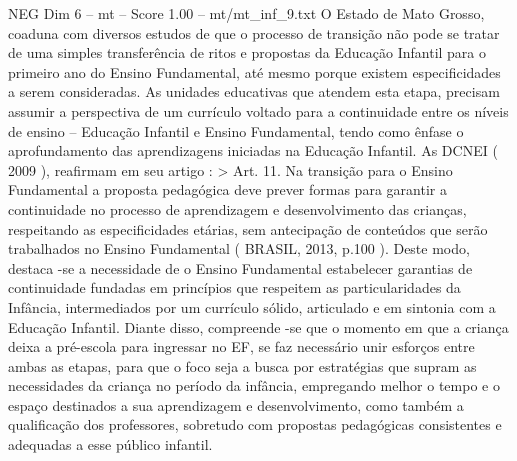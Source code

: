 \begin{textsample}{NEG Dim 6 – mt – Score 1.00 – mt/mt\_inf\_9.txt}
O Estado de Mato Grosso, coaduna com diversos estudos de que o processo de transição não pode se tratar de uma simples transferência de ritos e propostas da Educação Infantil para o primeiro ano do Ensino Fundamental, até mesmo porque existem especificidades a serem consideradas.
As unidades educativas que atendem esta etapa, precisam assumir a perspectiva de um currículo voltado para a continuidade entre os níveis de ensino – Educação Infantil e Ensino Fundamental, tendo como ênfase o aprofundamento das aprendizagens iniciadas na Educação Infantil.
As DCNEI ( 2009 ), reafirmam em seu artigo : > Art. 11.
Na transição para o Ensino Fundamental a proposta pedagógica deve prever formas para garantir a continuidade no processo de aprendizagem e desenvolvimento das crianças, respeitando as especificidades etárias, sem antecipação de conteúdos que serão trabalhados no Ensino Fundamental ( BRASIL, 2013, p.100 ).
Deste modo, destaca -se a necessidade de o Ensino Fundamental estabelecer garantias de continuidade fundadas em princípios que respeitem as particularidades da Infância, intermediados por um currículo sólido, articulado e em sintonia com a Educação Infantil.
Diante disso, compreende -se que o momento em que a criança deixa a pré-escola para ingressar no EF, se faz necessário unir esforços entre ambas as etapas, para que o foco seja a busca por estratégias que supram as necessidades da criança no período da infância, empregando melhor o tempo e o espaço destinados a sua aprendizagem e desenvolvimento, como também a qualificação dos professores, sobretudo com propostas pedagógicas consistentes e adequadas a esse público infantil.

\end{textsample}
